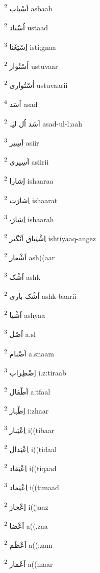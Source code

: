 \documentclass[12pt]{article}
\begin{document}
\begin{multicols}{5}
{\ur اَسْباب}   \textsuperscript{2} asbaab

{\ur اُسْتاد}   \textsuperscript{2} ustaad

{\ur اِسْتِغْنا}   \textsuperscript{3} isti;gnaa

{\ur اُسْتُوار}   \textsuperscript{2} ustuvaar

{\ur اُسْتُواری}   \textsuperscript{2} ustuvaarii

{\ur اَسَد}   \textsuperscript{4} asad

{\ur اَسَد اُل لیٰہ}   \textsuperscript{2} asad-ul-l;aah

{\ur اَسِیر}   \textsuperscript{3} asiir

{\ur اَسِیری}   \textsuperscript{2} asiirii

{\ur اِشارا}   \textsuperscript{2} ishaaraa

{\ur اِشارَت}   \textsuperscript{2} ishaarat

{\ur اِشارَہ}   \textsuperscript{3} ishaarah

{\ur اِشْتِیاق اَنْگیز}   \textsuperscript{2} ishtiyaaq-angez

{\ur اَشْعار}   \textsuperscript{2} ash((aar

{\ur اَشْک}   \textsuperscript{3} ashk

{\ur اَشْک باری}   \textsuperscript{2} ashk-baarii

{\ur اَشْیا}   \textsuperscript{2} ashyaa

{\ur اَصْل}   \textsuperscript{3} a.sl

{\ur اَصْنام}   \textsuperscript{2} a.snaam

{\ur اِضْطِراب}   \textsuperscript{3} i.z:tiraab

{\ur اَطْفال}   \textsuperscript{2} a:tfaal

{\ur اِظْہار}   \textsuperscript{2} i:zhaar

{\ur اِعْتِبار}   \textsuperscript{3} i((tibaar

{\ur اِعْتِدال}   \textsuperscript{2} i((tidaal

{\ur اِعْتِقاد}   \textsuperscript{2} i((tiqaad

{\ur اِعْتِماد}   \textsuperscript{3} i((timaad

{\ur اِعْجاز}   \textsuperscript{2} i((jaaz

{\ur اَعْضا}   \textsuperscript{2} a((.zaa

{\ur اَعْظَم}   \textsuperscript{2} a((:zam

{\ur اَعْمار}   \textsuperscript{2} a((maar


\end{multicols}
\end{document}
